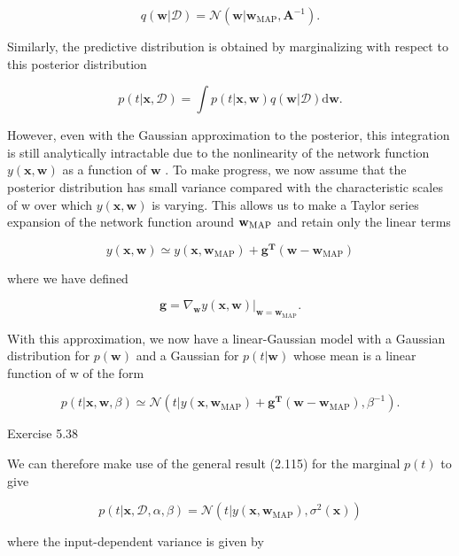\documentclass[
  10
]{article}
\begin{document}
\[
q (\mathbf {w} | \mathcal {D}) = \mathcal {N} (\mathbf {w} | \mathbf {w} _ {\mathrm{MAP}}, \mathbf {A} ^ {- 1}).\tag{5.167}
\]

Similarly, the predictive distribution is obtained by marginalizing with
respect to this posterior distribution

\[
p (t | \mathbf {x}, \mathcal {D}) = \int p (t | \mathbf {x}, \mathbf {w}) q (\mathbf {w} | \mathcal {D}) \mathrm{d} \mathbf {w}.\tag{5.168}
\]

However, even with the Gaussian approximation to the posterior, this
integration is still analytically intractable due to the nonlinearity of
the network function \(y ( \mathbf { x } , \mathbf { w } )\) as a
function of \(\mathbf { w }\) . To make progress, we now assume that the
posterior distribution has small variance compared with the
characteristic scales of w over which
\(y ( \mathbf { x } , \mathbf { w } )\) is varying. This allows us to
make a Taylor series expansion of the network function around
\({ \bf w } _ { \mathrm { M A P } }\) and retain only the linear terms

\[
y (\mathbf {x}, \mathbf {w}) \simeq y (\mathbf {x}, \mathbf {w} _ {\mathrm{MAP}}) + \mathbf {g} ^ {\mathbf {T}} (\mathbf {w} - \mathbf {w} _ {\mathrm{MAP}})\tag{5.169}
\]

where we have defined

\[
\mathbf {g} = \left. \nabla_ {\mathbf {w}} y (\mathbf {x}, \mathbf {w}) \right| _ {\mathbf {w} = \mathbf {w} _ {\mathrm{MAP}}}.\tag{5.170}
\]

With this approximation, we now have a linear-Gaussian model with a
Gaussian distribution for \(p ( \mathbf { w } )\) and a Gaussian for
\(p ( t | \mathbf { w } )\) whose mean is a linear function of w of the
form

\[
p (t | \mathbf {x}, \mathbf {w}, \beta) \simeq \mathcal {N} \left(t | y (\mathbf {x}, \mathbf {w} _ {\mathrm{MAP}}) + \mathbf {g} ^ {\mathbf {T}} (\mathbf {w} - \mathbf {w} _ {\mathrm{MAP}}), \beta^ {- 1}\right).\tag{5.171}
\]

Exercise 5.38

We can therefore make use of the general result (2.115) for the marginal
\(p ( t )\) to give

\[
p (t | \mathbf {x}, \mathcal {D}, \alpha , \beta) = \mathcal {N} \left(t | y (\mathbf {x}, \mathbf {w} _ {\mathrm{MAP}}), \sigma^ {2} (\mathbf {x})\right)\tag{5.172}
\]

where the input-dependent variance is given by
\end{document}
